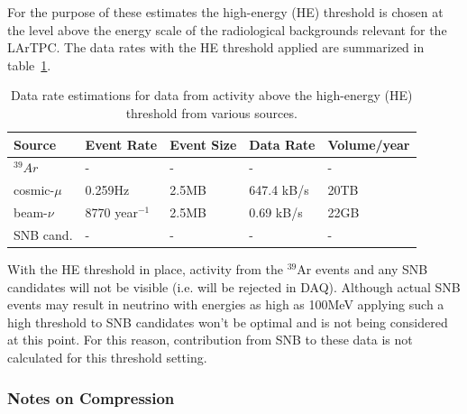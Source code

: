 For the purpose of these estimates the  high-energy (HE) threshold is chosen at the level above 
the energy scale of the radiological backgrounds relevant for the LArTPC.
The data rates with the HE threshold applied are summarized in table~\ref{tab:he-volume}.

	
\begin{table}[ht!]
\centering
\begin{tabular}{| p{1.2in} | p{0.95in} | p{0.75in} | p{1in} | p{0.9in} |}		\hline	
Source & Event Rate & Event Size & Data Rate & Volume/year \\ \hline
$^{39}Ar$ & - & - & - & -\\	\hline
cosmic-$\mu$ & 0.259Hz & 2.5MB & 647.4 kB/s & 20TB \\ \hline
beam-$\nu$ & 8770 year$^{-1}$ & 2.5MB & 0.69 kB/s & 22GB \\
\hline
SNB cand. & - & - & - & -\\ \hline
\end{tabular}
\caption{Data rate estimations for data from activity above the high-energy (HE) threshold from
various sources.}
\label{tab:he-volume}
\end{table}


%

With the HE threshold in place, activity from the $^{39}$Ar events and any SNB
candidates will not be visible (i.e. will be rejected in DAQ). Although actual SNB
events may result in neutrino with energies as high as 100MeV applying such a high
threshold to SNB candidates won't be optimal and is not being considered at this point.
For this reason, contribution from SNB to these data is not calculated for this threshold setting.


\subsubsection{Notes on Compression}
\label{sec:data-compression}

